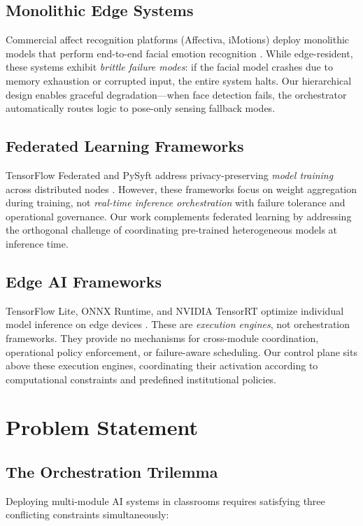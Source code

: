 \documentclass[conference]{IEEEtran}
\begin{document}
\subsection{Monolithic Edge Systems}
Commercial affect recognition platforms (Affectiva, iMotions) deploy monolithic models that perform end-to-end facial emotion recognition \cite{b7}. While edge-resident, these systems exhibit \textit{brittle failure modes}: if the facial model crashes due to memory exhaustion or corrupted input, the entire system halts. Our hierarchical design enables graceful degradation---when face detection fails, the orchestrator automatically routes logic to pose-only sensing fallback modes.

\subsection{Federated Learning Frameworks}
TensorFlow Federated and PySyft address privacy-preserving \textit{model training} across distributed nodes \cite{b8}. However, these frameworks focus on weight aggregation during training, not \textit{real-time inference orchestration} with failure tolerance and operational governance. Our work complements federated learning by addressing the orthogonal challenge of coordinating pre-trained heterogeneous models at inference time.

\subsection{Edge AI Frameworks}
TensorFlow Lite, ONNX Runtime, and NVIDIA TensorRT optimize individual model inference on edge devices \cite{b9, b10}. These are \textit{execution engines}, not orchestration frameworks. They provide no mechanisms for cross-module coordination, operational policy enforcement, or failure-aware scheduling. Our control plane sits above these execution engines, coordinating their activation according to computational constraints and predefined institutional policies.

\section{Problem Statement}

\subsection{The Orchestration Trilemma}
Deploying multi-module AI systems in classrooms requires satisfying three conflicting constraints simultaneously:
\end{document}
